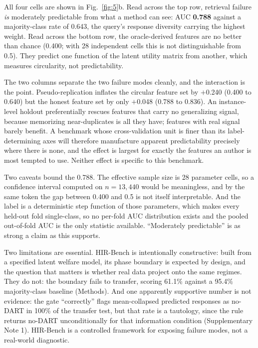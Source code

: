 \documentclass[11pt,letterpaper]{article}
\begin{document}
All four cells are shown in Fig.~\ref{fig:5}b. Read across the top row, retrieval failure
\emph{is} moderately predictable from what a method can see: AUC \textbf{0.788} against a
majority-class rate of 0.643, the query's response diversity carrying the highest weight. Read
across the bottom row, the oracle-derived features are no better than chance (0.400;
with 28 independent cells this is not distinguishable from 0.5). They predict one function of the
latent utility matrix from another, which measures circularity, not predictability.

The two columns separate the two failure modes cleanly, and the interaction is the point.
Pseudo-replication inflates the circular feature set by $+$0.240 (0.400 to 0.640)
but the honest feature set by only $+$0.048 (0.788 to 0.836). An instance-level
holdout preferentially rescues features that carry no generalizing signal, because
memorizing near-duplicates is all they have; features with real signal barely benefit.
A benchmark whose cross-validation unit is finer than its label-determining axes will
therefore manufacture apparent predictability precisely where there is none, and the effect
is largest for exactly the features an author is most tempted to use. Neither effect is
specific to this benchmark.

Two caveats bound the 0.788. The
effective sample size is 28 parameter cells, so a confidence interval computed on
$n = 13{,}440$ would be meaningless, and by the same token the gap between 0.400 and 0.5 is
not itself interpretable. And the label is a deterministic step function of those
parameters, which makes every held-out fold single-class, so no per-fold AUC distribution
exists and the pooled out-of-fold AUC is the only statistic available. ``Moderately
predictable'' is as strong a claim as this supports.

Two limitations are essential. HIR-Bench is intentionally constructive: built from a specified
latent welfare model, its phase boundary is expected by design, and the question that
matters is whether real data project onto the same regimes. They do not: the boundary fails to
transfer, scoring 61.1\% against a 95.4\% majority-class baseline (Methods). And one apparently
supportive number is not evidence: the gate ``correctly'' flags mean-collapsed predicted responses
as no-DART in 100\% of the transfer test, but that rate is a tautology, since the rule
returns no-DART unconditionally for that information condition (Supplementary Note 1). HIR-Bench is
a controlled framework for exposing failure modes, not a real-world diagnostic.
\end{document}
